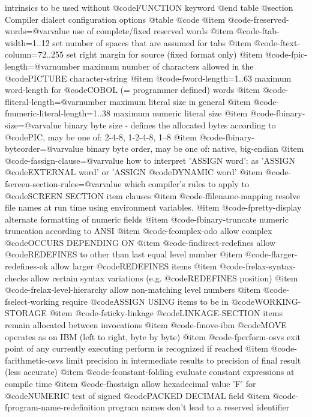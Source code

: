 intrinsics to be used without @code{FUNCTION} keyword
@end table
@section Compiler dialect configuration options
@table @code
@item @code{-freserved-words=@var{value}}
use of complete/fixed reserved words
@item @code{-ftab-width=1..12}
set number of spaces that are assumed for tabs
@item @code{-ftext-column=72..255}
set right margin for source (fixed format only)
@item @code{-fpic-length=@var{number}}
maximum number of characters allowed in the @code{PICTURE} character-string
@item @code{-fword-length=1..63}
maximum word-length for @code{COBOL} (= programmer defined) words
@item @code{-fliteral-length=@var{number}}
maximum literal size in general
@item @code{-fnumeric-literal-length=1..38}
maximum numeric literal size
@item @code{-fbinary-size=@var{value}}
binary byte size - defines the allocated bytes according to @code{PIC}, may be one of: 2-4-8, 1-2-4-8, 1--8
@item @code{-fbinary-byteorder=@var{value}}
binary byte order, may be one of: native, big-endian
@item @code{-fassign-clause=@var{value}}
how to interpret 'ASSIGN word': as 'ASSIGN @code{EXTERNAL} word' or 'ASSIGN @code{DYNAMIC} word'
@item @code{-fscreen-section-rules=@var{value}}
which compiler's rules to apply to @code{SCREEN SECTION} item clauses
@item @code{-ffilename-mapping}
resolve file names at run time using environment variables.
@item @code{-fpretty-display}
alternate formatting of numeric fields
@item @code{-fbinary-truncate}
numeric truncation according to ANSI
@item @code{-fcomplex-odo}
allow complex @code{OCCURS DEPENDING ON}
@item @code{-findirect-redefines}
allow @code{REDEFINES} to other than last equal level number
@item @code{-flarger-redefines-ok}
allow larger @code{REDEFINES} items
@item @code{-frelax-syntax-checks}
allow certain syntax variations (e.g. @code{REDEFINES} position)
@item @code{-frelax-level-hierarchy}
allow non-matching level numbers
@item @code{-fselect-working}
require @code{ASSIGN USING} items to be in @code{WORKING-STORAGE}
@item @code{-fsticky-linkage}
@code{LINKAGE-SECTION} items remain allocated between invocations
@item @code{-fmove-ibm}
@code{MOVE} operates as on IBM (left to right, byte by byte)
@item @code{-fperform-osvs}
exit point of any currently executing perform is recognized if reached
@item @code{-farithmetic-osvs}
limit precision in intermediate results to precision of final result (less accurate)
@item @code{-fconstant-folding}
evaluate constant expressions at compile time
@item @code{-fhostsign}
allow hexadecimal value 'F' for @code{NUMERIC} test of signed @code{PACKED DECIMAL} field
@item @code{-fprogram-name-redefinition}
program names don't lead to a reserved identifier
